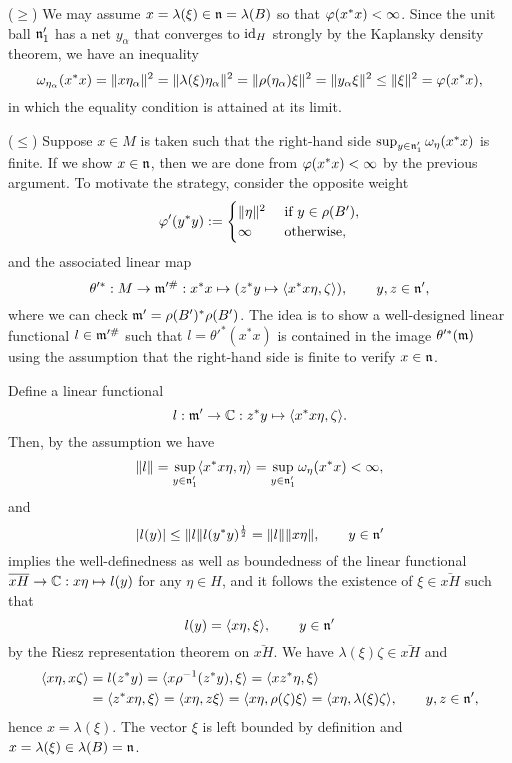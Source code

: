 \documentclass{../../small}
\begin{document}
\begin{pf}
($\ge$)
We may assume $x=\lambda(\xi)\in\mathfrak{n}=\lambda(B)$ so that $\varphi(x^*x)<\infty$.
Since the unit ball $\mathfrak{n}'_1$ has a net $y_\alpha$ that converges to $\operatorname{id}_H$ strongly by the Kaplansky density theorem, we have an inequality
\[\omega_{\eta_\alpha}(x^*x)=\|x\eta_\alpha\|^2=\|\lambda(\xi)\eta_\alpha\|^2=\|\rho(\eta_\alpha)\xi\|^2=\|y_\alpha\xi\|^2\le\|\xi\|^2=\varphi(x^*x),\]
in which the equality condition is attained at its limit.

($\le$)
Suppose $x\in M$ is taken such that the right-hand side $\sup_{y\in\mathfrak{n}'_1}\omega_{\eta}(x^*x)$ is finite.
If we show $x\in\mathfrak{n}$, then we are done from $\varphi(x^*x)<\infty$ by the previous argument.
To motivate the strategy, consider the opposite weight
\[\varphi'(y^*y):=\begin{cases}\|\eta\|^2&\text{ if }y\in\rho(B'),\\\infty&\text{ otherwise},\end{cases}\]
and the associated linear map
\[\theta'^*:M\to\mathfrak{m}'^\#:x^*x\mapsto(z^*y\mapsto\langle x^*x\eta,\zeta\rangle),\qquad y,z\in\mathfrak{n}',\]
where we can check $\mathfrak{m}'=\rho(B')^*\rho(B')$.
The idea is to show a well-designed linear functional $l\in\mathfrak{m}'^\#$ such that $l=\theta'^*(x^*x)$ is contained in the image $\theta'^*(\mathfrak{m})$ using the assumption that the right-hand side is finite to verify $x\in\mathfrak{n}$.

Define a linear functional
\[l:\mathfrak{m}'\to\mathbb{C}:z^*y\mapsto\langle x^*x\eta,\zeta\rangle.\]
Then, by the assumption we have
\[\|l\|=\sup_{y\in\mathfrak{n}'_1}\langle x^*x\eta,\eta\rangle=\sup_{y\in\mathfrak{n}'_1}\omega_\eta(x^*x)<\infty,\]
and
\[|l(y)|\le\|l\|l(y^*y)^{\frac12}=\|l\|\|x\eta\|,\qquad y\in\mathfrak{n}'\]
implies the well-definedness as well as boundedness of the linear functional $\overline{xH}\to\mathbb{C}:x\eta\mapsto l(y)$ for any $\eta\in H$, and it follows the existence of $\xi\in\bar{xH}$ such that
\[l(y)=\langle x\eta,\xi\rangle,\qquad y\in\mathfrak{n}'\]
by the Riesz representation theorem on $\bar{xH}$.
We have $\lambda(\xi)\zeta\in\bar{xH}$ and
\begin{align*}
\langle x\eta,x\zeta\rangle&=l(z^*y)=\langle x\rho^{-1}(z^*y),\xi\rangle=\langle xz^*\eta,\xi\rangle\\
&=\langle z^*x\eta,\xi\rangle=\langle x\eta,z\xi\rangle=\langle x\eta,\rho(\zeta)\xi\rangle=\langle x\eta,\lambda(\xi)\zeta\rangle,\qquad y,z\in\mathfrak{n}',
\end{align*}
hence $x=\lambda(\xi)$.
The vector $\xi$ is left bounded by definition and $x=\lambda(\xi)\in\lambda(B)=\mathfrak{n}$.
\end{pf}
\end{document}
